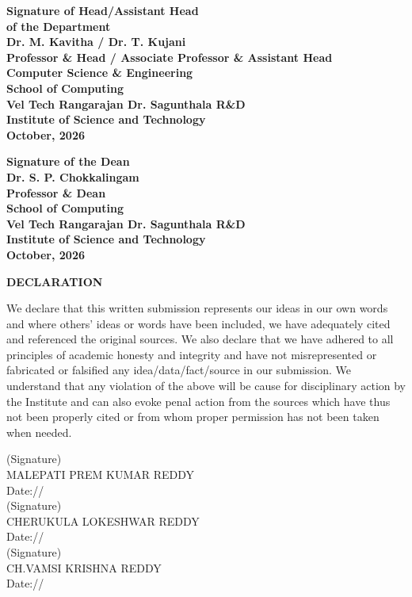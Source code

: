 \documentclass[10pt]{report}
\newcommand{\StudentOne}{MALEPATI PREM KUMAR REDDY}
\newcommand{\StudentTwo}{CHERUKULA LOKESHWAR REDDY}
\newcommand{\StudentThree}{CH.VAMSI KRISHNA REDDY}
\newcommand{\SubmissionDate}{October, 2026}
\newcommand{\HeadName}{Dr. M. Kavitha / Dr. T. Kujani}
\newcommand{\HeadDesignation}{Professor \& Head / Associate Professor \& Assistant Head}
\newcommand{\DeanName}{Dr. S. P. Chokkalingam}
\begin{document}
\noindent\begin{minipage}[t]{0.53\linewidth}
\raggedright\fontsize{11}{15.5}\selectfont\bfseries
Signature of Head/Assistant Head\\of the Department\\[4mm]
\HeadName\\\HeadDesignation\\
Computer Science \& Engineering\\School of Computing\\
Vel Tech Rangarajan Dr. Sagunthala R\&D\\
Institute of Science and Technology\\\SubmissionDate
\end{minipage}\hfill
\begin{minipage}[t]{0.43\linewidth}
\raggedright\fontsize{11}{15.5}\selectfont\bfseries
Signature of the Dean\\[4mm]
\DeanName\\Professor \& Dean\\School of Computing\\
Vel Tech Rangarajan Dr. Sagunthala R\&D\\
Institute of Science and Technology\\\SubmissionDate
\end{minipage}

\newpage
\begin{center}
\Huge \textbf{DECLARATION}
\end{center}
\linespread{1.5}
\large{
 We declare that this written submission represents our ideas in our own words and where others' ideas or words have been included, we have adequately cited and referenced the original sources. We also declare that we have adhered to all principles of academic honesty and integrity and have not misrepresented or fabricated or falsified any idea/data/fact/source in our submission. We understand that any violation of the above will be cause for disciplinary action by the Institute and can also evoke penal action from the sources which have thus not been properly cited or from whom proper permission has not been taken when needed.}
\vspace{2.0cm}
\begin{flushright}
(Signature)\\
\large{\StudentOne}\\
\large{Date:\hspace*{1.0cm}/\hspace*{1.0cm}/}\\[2.0cm]
(Signature)\\
\large{\StudentTwo}\\
\large{Date:\hspace*{1.0cm}/\hspace*{1.0cm}/}\\[2.0cm]
(Signature)\\
\large{\StudentThree}\\
\large{Date:\hspace*{1.0cm}/\hspace*{1.0cm}/}\\[2.0cm]
\end{flushright}
\newpage
\end{document}
